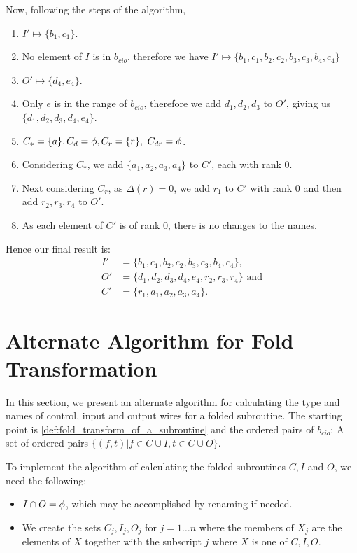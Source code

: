 Now, following the steps of the algorithm,
\begin{enumerate}
  \item $I' \mapsto \{b_1,c_1\}$.
  \item No element of $I$ is in $b_{cio}$, therefore we have
    $I' \mapsto \{b_1,c_1,b_2,c_2,b_3,c_3,b_4,c_4\}$
  \item $O' \mapsto \{d_4,e_4\}$.
  \item Only $e$ is in the range of $b_{cio}$, therefore we add
    $d_1,d_2,d_3$ to  $O'$, giving us $\{d_1,d_2,d_3,d_4,e_4\}$.
  \item $C_*=\{a\},C_d=\nothing, C_r = \{r\},\ C_{dr}=\nothing$.
  \item Considering $C_*$, we add $\{a_1,a_2,a_3,a_4\}$ to $C'$, each with rank 0.
  \item Next considering $C_r$, as $\Delta(r)=0$, we add $r_1$ to $C'$ with
    rank 0 and then add $r_2,r_3,r_4$ to $O'$.
  \item As each element of $C'$ is of rank 0, there is no changes to the names.
\end{enumerate}

Hence our final result is:
\begin{align*}
  I'&=\{b_1,c_1,b_2,c_2,b_3,c_3,b_4,c_4\},\\
  O'&=\{d_1,d_2,d_3,d_4,e_4,r_2,r_3,r_4\}\text{ and}\\
  C'&=\{r_1,a_1,a_2,a_3,a_4\}.
\end{align*}


\section{Alternate Algorithm for Fold Transformation} %
\label{sec:alternate_algorithm_for_fold_transformation}
In this section, we present an alternate algorithm for calculating the type and names of control,
input and output wires for a folded subroutine. The starting point is
\vref{def:fold_transform_of_a_subroutine} and the ordered pairs of $b_{cio}$: A set of ordered
pairs $\{(f,t)|f\in C\cup I, t \in C\cup O\}$.

To implement the algorithm of calculating the folded subroutines $C,I$ and $O$, we need the
following:
\begin{itemize}
  \item $I\cap O = \phi$, which may be accomplished by renaming if needed.
  \item We create the sets $C_j,I_j,O_j$ for $j=1\ldots n$ where the members
    of $X_j$ are the elements of $X$ together with the subscript $j$ where
    $X$ is one of $C,I,O$.
\end{itemize}


